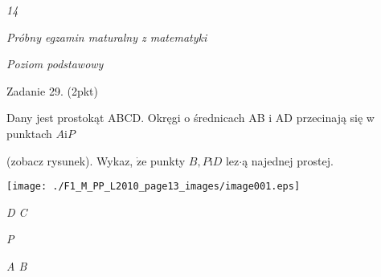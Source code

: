 \documentclass[a4paper,12pt]{article}
\begin{document}
{\it 14}

{\it Próbny egzamin maturalny z matematyki}

{\it Poziom podstawowy}

Zadanie 29. (2pkt)

Dany jest prostokąt ABCD. Okręgi o średnicach AB $\mathrm{i}$ AD przecinają się w punktach $A\mathrm{i}P$

(zobacz rysunek). Wykaz, $\dot{\mathrm{z}}\mathrm{e}$ punkty $B, P\mathrm{i}D$ lez$\cdot$ą najednej prostej.
\begin{center}
\texttt{[image: ./F1\_M\_PP\_L2010\_page13\_images/image001.eps]}
\end{center}
{\it D  C}

{\it P}

{\it A  B}
\end{document}
